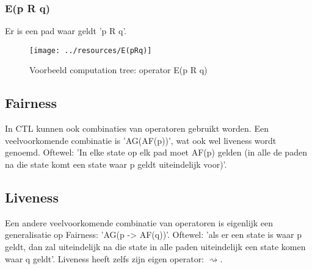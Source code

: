 \documentclass{article}
\begin{document}
      \subsubsection{E(p R q)}
        Er is een pad waar geldt 'p R q'.
        \begin{figure}[h]
          \centering
          \texttt{[image: ../resources/E(pRq)]}
          \caption{Voorbeeld computation tree: operator E(p R q)}
          \label{fig:eprq}
        \end{figure}


  \subsection{Fairness}
    In CTL kunnen ook combinaties van operatoren gebruikt worden. Een veelvoorkomende combinatie is 'AG(AF(p))', wat ook wel liveness wordt genoemd. Oftewel: 'In elke state op elk pad moet AF(p) gelden (in alle de paden na die state komt een state waar p geldt uiteindelijk voor)'.

  \subsection{Liveness}
    Een andere veelvoorkomende combinatie van operatoren is eigenlijk een generalisatie op Fairness: 'AG(p -> AF(q))'. Oftewel: 'als er een state is waar p geldt, dan zal uiteindelijk na die state in alle paden uiteindelijk een state komen waar q geldt'. Liveness heeft zelfs zijn eigen operator: $\rightsquigarrow$.


\newpage

  \newpage
  
  
\end{document}
